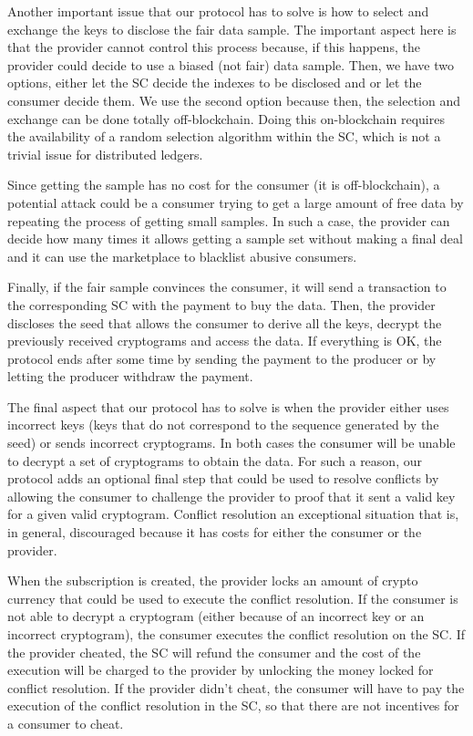 \documentclass[]{article}
\begin{document}
	Another important issue that our protocol has to solve is how to select and exchange the keys to disclose the fair data sample. The important aspect here is that the provider cannot control this process because, if this happens, the provider could decide to use a biased (not fair) data sample. Then, we have two options, either let the SC decide the indexes to be disclosed and or let the consumer decide them. We use the second option because then, the selection and exchange can be done totally off-blockchain. Doing this on-blockchain requires the availability of a random selection algorithm within the SC, which is not a trivial issue for distributed ledgers.

	Since getting the sample has no cost for the consumer (it is off-blockchain), a potential attack could be a consumer trying to get a large amount of free data by repeating the process of getting small samples. In such a case, the provider can decide how many times it allows getting a sample set without making a final deal and it can use the marketplace to blacklist abusive consumers.

	Finally, if the fair sample convinces the consumer, it will send a transaction to the corresponding SC with the payment to buy the data. Then, the provider discloses the seed that allows the consumer to derive all the keys, decrypt the previously received cryptograms and access the data. If everything is OK, the protocol ends after some time by sending the payment to the producer or by letting the producer withdraw the payment.

	The final aspect that our protocol has to solve is when the provider either uses incorrect keys (keys that do not correspond to the sequence generated by the seed) or sends incorrect cryptograms. In both cases the consumer will be unable to decrypt a set of cryptograms to obtain the data. For such a reason, our protocol adds an optional final step that could be used to resolve conflicts by allowing the consumer to challenge the provider to proof that it sent a valid key for a given valid cryptogram. Conflict resolution an exceptional situation that is, in general, discouraged because it has costs for either the consumer or the provider.

	When the subscription is created, the provider locks an amount of crypto currency that could be used to execute the conflict resolution. If the consumer is not able to decrypt a cryptogram (either because of an incorrect key or an incorrect cryptogram), the consumer executes the conflict resolution on the SC. If the provider cheated, the SC will refund the consumer and the cost of the execution will be charged to the provider by unlocking the money locked for conflict resolution. If the provider didn’t cheat, the consumer will have to pay the execution of the conflict resolution in the SC, so that there are not incentives for a consumer to cheat.
\end{document}
